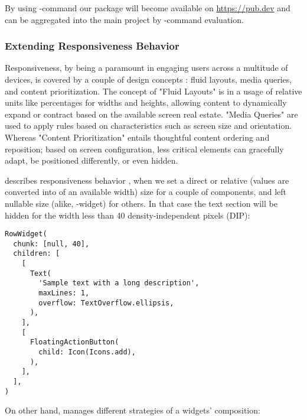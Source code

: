 \noindent By using -command our package will become available on 
\href{https://pub.dev}{https://pub.dev} and can be aggregated into the main project by 
-command evaluation.


\subsubsection{Extending Responsiveness Behavior}

Responsiveness, by being a paramount in engaging users across a multitude of devices, is covered by a couple of design 
concepts \cite{Frai22}: fluid layouts, media queries, and content prioritization. The concept of "Fluid Layouts" is in 
a usage of relative units like percentages for widths and heights, allowing content to dynamically expand or contract 
based on the available screen real estate. "Media Queries" are used to apply rules based on characteristics such as 
screen size and orientation. Whereas "Content Prioritization" entails thoughtful content ordering and reposition;
based on screen configuration, less critical elements can gracefully adapt, be positioned differently, or even hidden.

 describes responsiveness behavior ,  when we set a direct or 
relative (values  are converted into  of an available width) size for a couple of 
components, and left nullable size (alike, -widget) for others. In that case the text section will be hidden 
for the width less than 40 density-independent pixels (DIP):

\begin{lstlisting}
RowWidget(
  chunk: [null, 40],
  children: [
    [
      Text(
        'Sample text with a long description', 
        maxLines: 1,
        overflow: TextOverflow.ellipsis,
      ),
    ],
    [
      FloatingActionButton(
        child: Icon(Icons.add),
      ),
    ],
  ],
)
\end{lstlisting}

\noindent On other hand,  manages  different strategies of a widgets' composition: 

